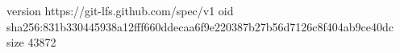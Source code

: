 version https://git-lfs.github.com/spec/v1
oid sha256:831b330445938a12fff660ddecaa6f9e220387b27b56d7126c8f404ab9ce40dc
size 43872
